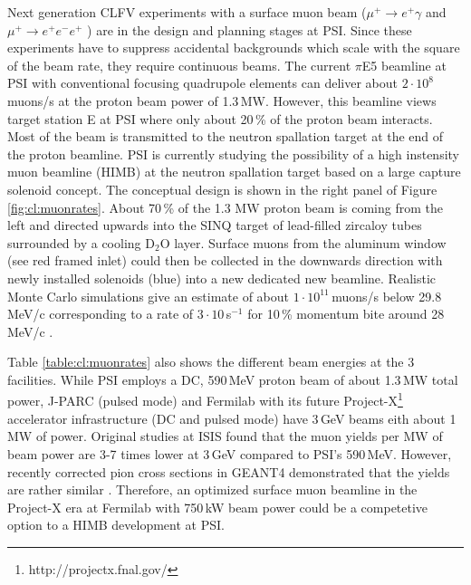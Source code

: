 Next generation CLFV experiments with a surface muon beam ($\mu^+ \to e^+\gamma$ \cite{Baldini:2013ke} and $\mu^+ \to e^+e^-e^+$ \cite{Blondel:2013ia}) are in the design and planning stages at PSI. Since these experiments have to suppress accidental backgrounds which scale with the square of the beam rate, they require continuous beams. The current $\pi$E5 beamline at PSI with conventional focusing quadrupole elements can deliver about $2\cdot10^8$\,muons/s at the proton beam power of 1.3\,MW. However, this beamline views target station E \cite{Heidenreich:2002zz} at PSI where only about 20\,\% of the proton beam interacts. Most of the beam is transmitted to the neutron spallation target at the end of the proton beamline. PSI is currently studying the possibility of a high instensity muon beamline (HIMB) at the neutron spallation target based on a large capture solenoid concept. The conceptual design is shown in the right panel of Figure \ref{fig:cl:muonrates}. About 70\,\% of the 1.3 MW proton beam is coming from the left and directed upwards into the SINQ target of lead-filled zircaloy tubes surrounded by a cooling D$_2$O layer. Surface muons from the aluminum window (see red framed inlet) could then be collected in the downwards direction with newly installed solenoids (blue) into a new dedicated new beamline. Realistic Monte Carlo simulations give an estimate of about $1\cdot10^{11}$\,muons/s below 29.8\,MeV/c corresponding to a rate of $3\cdot 10$\,s$^{-1}$ for 10\,\% momentum bite around 28\,MeV/c \cite{Blondel:2013ia}.

Table \ref{table:cl:muonrates} also shows the different beam energies at the 3 facilities. While PSI employs a DC, 590\,MeV proton beam of about 1.3\,MW total power, J-PARC (pulsed mode) and Fermilab with its future Project-X\footnote{http://projectx.fnal.gov/} accelerator infrastructure (DC and pulsed mode) have 3\,GeV beams eith about 1\,MW of power. Original studies at ISIS \cite{Bungau:2013hd} found that the muon yields per MW of beam power are 3-7 times lower at 3\,GeV compared to PSI's 590\,MeV. However, recently corrected pion cross sections in GEANT4 demonstrated that the yields are rather similar \cite{striganov:12}. Therefore, an optimized surface muon beamline in the Project-X era at Fermilab with 750\,kW beam power could be a competetive option to a HIMB development at PSI. 

